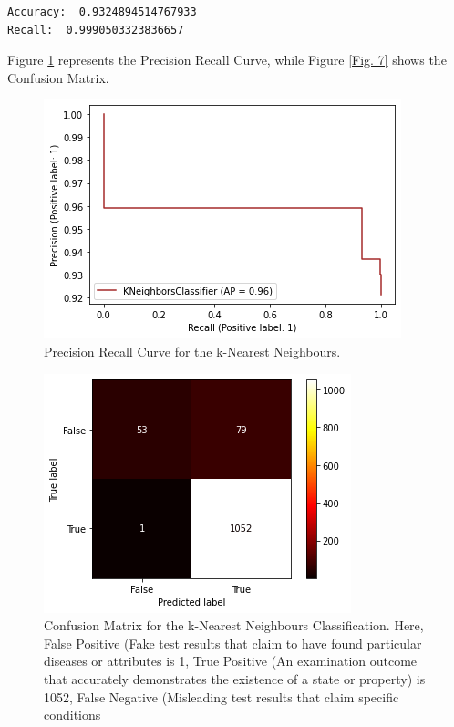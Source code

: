 \documentclass[sn-basic]{sn-jnl}%
\theoremstyle{thmstyleone}%
\theoremstyle{thmstyletwo}%
\theoremstyle{thmstylethree}%
\begin{document}
\begin{enumerate}
\begin{verbatim}
Accuracy:  0.9324894514767933
Recall:  0.9990503323836657
\end{verbatim}
Figure \ref{Fig. 6} represents the Precision Recall Curve, while Figure \ref{Fig. 7} shows the Confusion Matrix. 
\begin{figure}[!h]
\centering
\includegraphics[width=\textwidth]{PRC_KNN}
\caption{Precision Recall Curve for the k-Nearest Neighbours. }
\label{Fig. 6}
\end{figure}
\begin{figure}[!h]
\centering
\includegraphics[width=\textwidth]{CM_KNN}
\caption{Confusion Matrix for the k-Nearest Neighbours Classification. Here, False Positive (Fake test results that claim to have found particular diseases or attributes is 1, True Positive (An examination outcome that accurately demonstrates the existence of a state or property) is 1052, False Negative (Misleading test results that claim specific conditions
}
\end{figure}
\end{enumerate}
\end{document}
